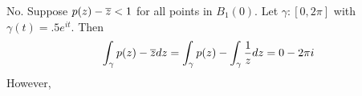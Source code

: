 \documentclass{homework}
\begin{document}
                                                                                                                                                                                                                                                \begin{solution}
                                                                                                                                                                                                                                                No. Suppose $p(z) - \overline{z} < 1$ for all points in $B_1(0)$. 
                                                                                                                                                                                                                                                Let $\gamma:[0,2\pi]$ with $\gamma(t) = .5e^{it}$. Then
                                                                                                                                                                                                                                                \begin{align*}
                                                                                                                                                                                                                                                    \int_{\gamma} p(z) - \overline{z}dz = 
                                                                                                                                                                                                                                                            \int_{\gamma} p(z) - \int_{\gamma} \frac{1}{z} dz = 0-2\pi i
                                                                                                                                                                                                                                                            \end{align*}
                                                                                                                                                                                                                                                            However, 
                                                                                                                                                                                                                                                            \begin{align*}

\end{align*}
\end{solution}
\end{document}
